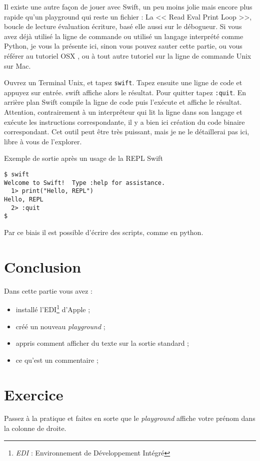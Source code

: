 Il existe une autre façon de jouer avec Swift,
un peu moins jolie mais encore plus rapide qu’un playground
qui reste un fichier :
La << Read Eval Print Loop >>, boucle de lecture évaluation écriture,
basé elle aussi sur le débogueur.
Si vous avez déjà utilisé la ligne de commande
ou utilisé un langage interprété comme Python,
je vous la présente ici, sinon vous pouvez sauter cette partie,
ou vous référer au tutoriel OSX ,
ou à tout autre tutoriel sur la ligne de commande Unix sur Mac.

Ouvrez un Terminal Unix, et tapez \verb"swift".
Tapez ensuite une ligne de code et appuyez sur entrée.
swift affiche alors le résultat.
Pour quitter tapez \verb":quit".
En arrière plan Swift compile la ligne de code
puis l'exécute et affiche le résultat.
Attention, contrairement à un interpréteur qui lit la ligne dans son langage
et exécute les instructions correspondante,
il y a bien ici création du code binaire correspondant.
Cet outil peut être très puissant,
mais je ne le détaillerai pas ici, libre à vous de l’explorer.
\begin{listing}[H]
\caption{Exemple de sortie après un usage de la REPL Swift}
\begin{verbatim}
$ swift
Welcome to Swift!  Type :help for assistance.
  1> print("Hello, REPL")
Hello, REPL
  2> :quit
$
\end{verbatim}
\end{listing}
Par ce biais il est possible d'écrire des scripts, comme en python.



\section*{Conclusion}
{}
Dans cette partie vous avez :
\begin{itemize}
\item installé l'EDI\footnote{\emph{EDI} : Environnement de Développement Intégré} d'Apple ;
\item créé un nouveau \emph{playground} ;
\item appris comment afficher du texte sur la sortie standard ;
\item ce qu'est un commentaire ;
\end{itemize}
\section*{Exercice}
{}
Passez à la pratique et faites en sorte que le \emph{playground} affiche
votre prénom dans la colonne de droite.
